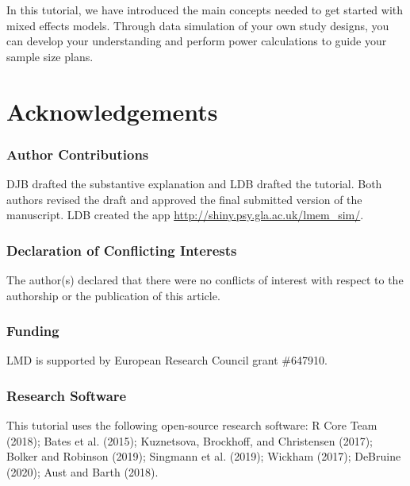 \documentclass[
  english,
  doc,floatsintext]{apa6}
\begin{document}
In this tutorial, we have introduced the main concepts needed to get started with mixed effects models. Through data simulation of your own study designs, you can develop your understanding and perform power calculations to guide your sample size plans.

\hypertarget{acknowledgements}{%
\section{Acknowledgements}\label{acknowledgements}}

\hypertarget{author-contributions}{%
\subsubsection{Author Contributions}\label{author-contributions}}

DJB drafted the substantive explanation and LDB drafted the tutorial. Both authors revised the draft and approved the final submitted version of the manuscript. LDB created the app \url{http://shiny.psy.gla.ac.uk/lmem_sim/}.

\hypertarget{declaration-of-conflicting-interests}{%
\subsubsection{Declaration of Conflicting Interests}\label{declaration-of-conflicting-interests}}

The author(s) declared that there were no conflicts of interest with respect to the authorship or the publication of this article.

\hypertarget{funding}{%
\subsubsection{Funding}\label{funding}}

LMD is supported by European Research Council grant \#647910.

\hypertarget{research-software}{%
\subsubsection{Research Software}\label{research-software}}

This tutorial uses the following open-source research software: R Core Team (2018); Bates et al. (2015); Kuznetsova, Brockhoff, and Christensen (2017); Bolker and Robinson (2019); Singmann et al. (2019); Wickham (2017); DeBruine (2020); Aust and Barth (2018).
\end{document}
